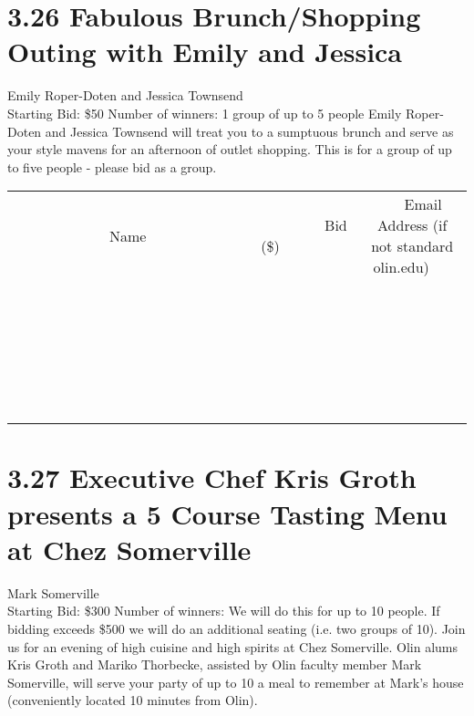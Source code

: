 \documentclass[11pt]{article}
\begin{document}
\section*{3.26 Fabulous Brunch/Shopping Outing with Emily and Jessica}
Emily Roper-Doten and Jessica Townsend
\\
Starting Bid: \$50
\newline
Number of winners: 1 group of up to 5 people
\newline
Emily Roper-Doten and Jessica Townsend will treat you to a sumptuous brunch and serve as your style mavens for an afternoon of outlet shopping. This is for a group of up to five people - please bid as a group.
\\[6ex]
\begin{tabular}{c c c}
~~~~~~~~~~~~~Name~~~~~~~~~~~~~ & ~~~~~~~~~Bid (\$)~~~~~~~~~  & ~~~Email Address (if not standard olin.edu)~~~\\
 & & \\
\hline
 & & \\
\hline
 & & \\
\hline
 & & \\
\hline
 & & \\
\hline
 & & \\
\hline
 & & \\
\hline
 & & \\
\hline
 & & \\
\hline
 & & \\
\hline
 & & \\
\hline
 & & \\
\hline
 & & \\
\hline
 & & \\
\hline
 & & \\
\hline
 & & \\
\hline
 & & \\
\hline
 & & \\
\hline
 & & \\
\hline
 & & \\
\hline
 & & \\
\hline
 & & \\
\hline
 & & \\
\hline
 & & \\
\hline
 & & \\
\hline
 & & \\
\hline
\end{tabular}
\newpage
\section*{3.27 Executive Chef Kris Groth presents a 5 Course Tasting Menu at Chez Somerville}
Mark Somerville
\\
Starting Bid: \$300
\newline
Number of winners: We will do this for up to 10 people.  If bidding exceeds \$500 we will do an additional seating (i.e. two groups of 10).
\newline
Join us for an evening of high cuisine and high spirits at Chez Somerville.  Olin alums Kris Groth and Mariko Thorbecke, assisted by Olin faculty member Mark Somerville, will serve your party of up to 10  a meal to remember at Mark's house (conveniently located 10 minutes from Olin). 
\end{document}
